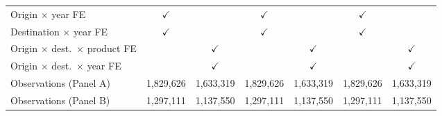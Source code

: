 \begin{tabular}{lcccccc}
Origin $\times$ year FE & $\checkmark$ &  & $\checkmark$ &  & $\checkmark$ &  \\
Destination $\times$ year FE & $\checkmark$ &  & $\checkmark$ &  & $\checkmark$ &  \\
Origin $\times$ dest.\ $\times$ product FE &  & $\checkmark$ &  & $\checkmark$ &  & $\checkmark$ \\
Origin $\times$ dest.\ $\times$ year FE &  & $\checkmark$ &  & $\checkmark$ &  & $\checkmark$ \\
Observations (Panel A) & 1,829,626 & 1,633,319 & 1,829,626 & 1,633,319 & 1,829,626 & 1,633,319 \\
Observations (Panel B) & 1,297,111 & 1,137,550 & 1,297,111 & 1,137,550 & 1,297,111 & 1,137,550 \\
\hline
\end{tabular}
